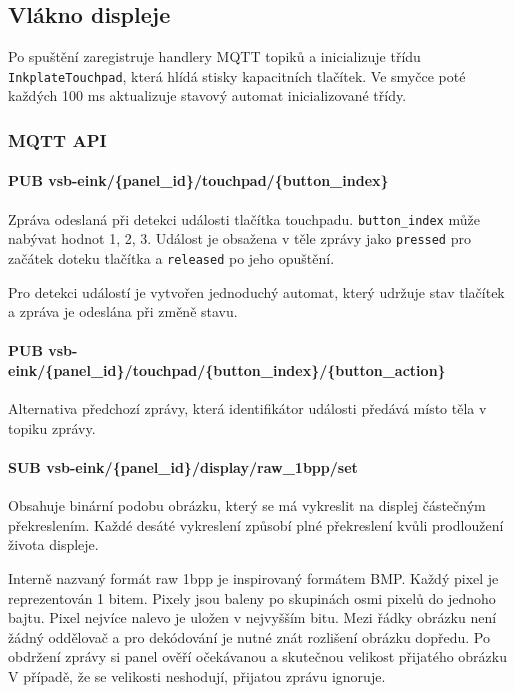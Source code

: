 \subsection{Vlákno displeje}
Po spuštění zaregistruje handlery MQTT topiků a inicializuje třídu \lstinline|InkplateTouchpad|, která hlídá stisky kapacitních tlačítek. Ve smyčce poté každých 100 ms aktualizuje stavový automat inicializované třídy.

\subsubsection*{MQTT API}
\paragraph*{PUB vsb-eink/\{panel\_id\}/touchpad/\{button\_index\}}
Zpráva odeslaná při detekci události tlačítka touchpadu. \lstinline{button_index} může nabývat hodnot 1, 2, 3. Událost je obsažena v těle zprávy jako \verb|pressed| pro začátek doteku tlačítka a \verb|released| po jeho opuštění.

Pro detekci událostí je vytvořen jednoduchý automat, který udržuje stav tlačítek a zpráva je odeslána při změně stavu.

\paragraph*{PUB vsb-eink/\{panel\_id\}/touchpad/\{button\_index\}/\{button\_action\}}
Alternativa předchozí zprávy, která identifikátor události předává místo těla v topiku zprávy.

\paragraph*{SUB vsb-eink/\{panel\_id\}/display/raw\_1bpp/set}
Obsahuje binární podobu obrázku, který se má vykreslit na displej částečným překreslením. Každé desáté vykreslení způsobí plné překreslení kvůli prodloužení života displeje.

Interně nazvaný formát raw 1bpp je inspirovaný formátem BMP. Každý pixel je reprezentován 1 bitem. Pixely jsou baleny po skupinách osmi pixelů do jednoho bajtu. Pixel nejvíce nalevo je uložen v nejvyšším bitu. Mezi řádky obrázku není žádný oddělovač a pro dekódování je nutné znát rozlišení obrázku dopředu. Po obdržení zprávy si panel ověří očekávanou a skutečnou velikost přijatého obrázku V případě, že se velikosti neshodují, přijatou zprávu ignoruje.

